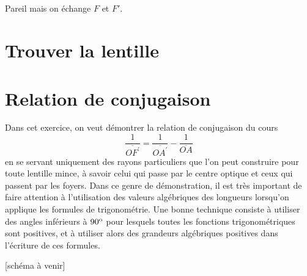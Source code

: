 \documentclass[10pt,a5paper,notitlepage]{book}
\begin{document}
\subsection{}
Pareil mais on échange $F$ et $F'$.

\section{Trouver la lentille}

\section{Relation de conjugaison}

Dans cet exercice, on veut démontrer la relation de conjugaison du cours
\begin{equation*}
	\boxed{\dfrac{1}{\overline{OF^\prime}} = \dfrac{1}{\overline{OA^\prime}} - \dfrac{1}{\overline{OA}}}
\end{equation*}
en se servant uniquement des rayons particuliers que l'on peut construire pour toute lentille mince, à savoir celui qui passe par le centre optique et ceux qui passent par les foyers. Dans ce genre de démonstration, il est très important de faire attention à l'utilisation des valeurs algébriques des longueurs lorsqu'on applique les formules de trigonométrie. Une bonne technique consiste à utiliser des angles inférieurs à $90^{\rm o}$ pour lesquels toutes les fonctions trigonométriques sont positives, et à utiliser alors des grandeurs algébriques positives dans l'écriture de ces formules.

\begin{center}
[schéma à venir]
\end{center}
\end{document}
